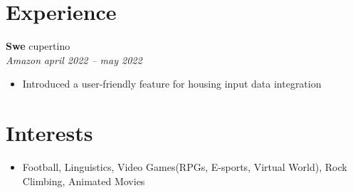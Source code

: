 \documentclass[letterpaper,10pt]{article}
\begin{document}
\section{Experience}
\textbf{Swe} \hfill cupertino \\
\textit{Amazon} \hfill \textit{april 2022 -- may 2022}
\begin{itemize}
  \item Introduced a user-friendly feature for housing input data integration
\end{itemize}








\section{Interests}
\begin{itemize}
  \item Football, Linguistics, Video Games(RPGs, E-sports, Virtual World), Rock Climbing, Animated Movies
\end{itemize}
\end{document}
